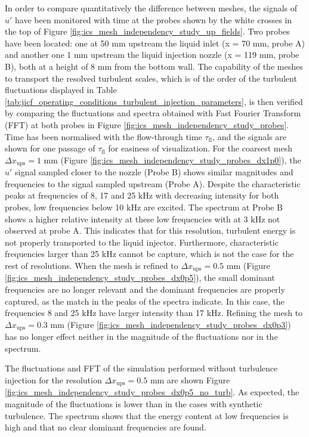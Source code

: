 In order to compare quantitatively the difference between meshes, the signals of $u'$ have been monitored with time at the probes shown by the white crosses in the top of Figure \ref{fig:ics_mesh_independency_study_up_fields}. Two probes have been located: one at 50 mm upstream the liquid inlet (x = 70 mm, probe A) and another one 1 mm upstream the liquid injection nozzle (x = 119 mm, probe B), both at a height of 8 mm from the bottom wall. The capability of the meshes to transport the resolved turbulent scales, which is of the order of the turbulent fluctuations displayed in Table \ref{tab:jicf_operating_conditions_turbulent_injection_parameters}, is then verified by comparing the fluctuations and spectra obtained with Fast Fourier Transform (FFT) at both probes in Figure \ref{fig:ics_mesh_independency_study_probes}. Time has been normalised with the flow-through time $\tau_\mathrm{fl}$, and the signals are shown for one passage of $\tau_\mathrm{fl}$ for easiness of visualization. For the coarsest mesh $\Delta x_\mathrm{ups} = 1$ mm (Figure \ref{fig:ics_mesh_independency_study_probes_dx1p0}), the $u'$ signal sampled closer to the nozzle (Probe B) shows similar magnitudes and frequencies to the signal sampled upstream (Probe A). Despite the characteristic peaks at frequencies of 8, 17 and 25 $\mathrm{kHz}$ with decreasing intensity for both probes, low frequencies below 10 $\mathrm{kHz}$ are excited. The spectrum at Probe B shows a higher relative intensity at these low frequencies with at 3 $\mathrm{kHz}$ not observed at probe A. This indicates that for this resolution, turbulent energy is not properly transported to the liquid injector. Furthermore, characteristic frequencies larger than 25 $\mathrm{kHz}$ cannot be capture, which is not the case for the rest of resolutions. When the mesh is refined to $\Delta x_\mathrm{ups} = 0.5$ mm (Figure \ref{fig:ics_mesh_independency_study_probes_dx0p5}), the small dominant frequencies are no longer relevant and the dominant frequencies are properly captured, as the match in the peaks of the spectra indicate. In this case, the frequencies 8 and 25 $\mathrm{kHz}$ have larger intensity than 17 $\mathrm{kHz}$. Refining the mesh to $\Delta x_\mathrm{ups} = 0.3$ mm (Figure \ref{fig:ics_mesh_independency_study_probes_dx0p3}) has no longer effect neither in the magnitude of the fluctuations nor in the spectrum. 

The fluctuations and FFT of the simulation performed without turbulence injection for the resolution $\Delta x_\mathrm{ups} = 0.5$ mm are shown Figure \ref{fig:ics_mesh_independency_study_probes_dx0p5_no_turb}. As expected, the magnitude of the fluctuations is lower than in the cases with synthetic turbulence. The spectrum shows that the energy content at low frequencies is high and that no clear dominant frequencies are found. \\




